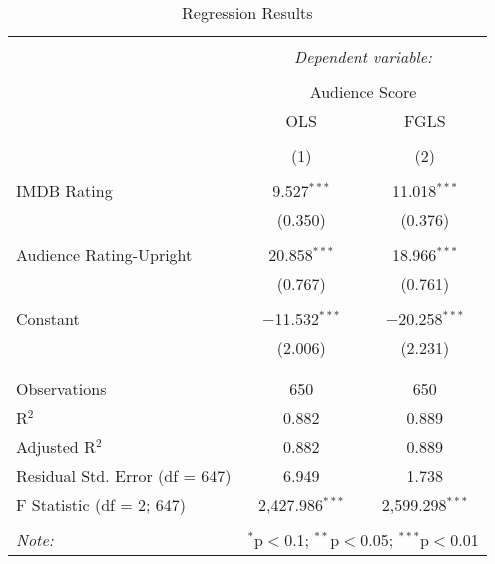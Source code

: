 \begin{table}[!htbp] \centering 
  \caption{Regression Results} 
  \label{tab: 2} 
\begin{tabular}{@{\extracolsep{5pt}}lcc} 
\\[-1.8ex]\hline 
\hline \\[-1.8ex] 
 & \multicolumn{2}{c}{\textit{Dependent variable:}} \\ 
\cline{2-3} 
\\[-1.8ex] & \multicolumn{2}{c}{Audience Score} \\ 
 & OLS & FGLS \\ 
\\[-1.8ex] & (1) & (2)\\ 
\hline \\[-1.8ex] 
 IMDB Rating & 9.527$^{***}$ & 11.018$^{***}$ \\ 
  & (0.350) & (0.376) \\ 
  & & \\ 
 Audience Rating-Upright & 20.858$^{***}$ & 18.966$^{***}$ \\ 
  & (0.767) & (0.761) \\ 
  & & \\ 
 Constant & $-$11.532$^{***}$ & $-$20.258$^{***}$ \\ 
  & (2.006) & (2.231) \\ 
  & & \\ 
\hline \\[-1.8ex] 
Observations & 650 & 650 \\ 
R$^{2}$ & 0.882 & 0.889 \\ 
Adjusted R$^{2}$ & 0.882 & 0.889 \\ 
Residual Std. Error (df = 647) & 6.949 & 1.738 \\ 
F Statistic (df = 2; 647) & 2,427.986$^{***}$ & 2,599.298$^{***}$ \\ 
\hline 
\hline \\[-1.8ex] 
\textit{Note:}  & \multicolumn{2}{r}{$^{*}$p$<$0.1; $^{**}$p$<$0.05; $^{***}$p$<$0.01} \\ 
\end{tabular} 
\end{table}